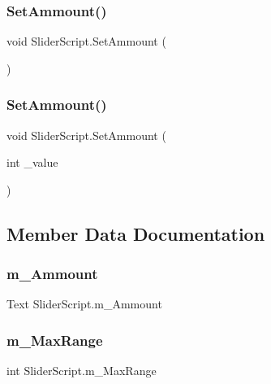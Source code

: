 \subsubsection{\texorpdfstring{SetAmmount()}{SetAmmount()}\hspace{0.1cm}{\footnotesize\ttfamily [1/2]}}
{\footnotesize\ttfamily void Slider\+Script.\+Set\+Ammount (\begin{DoxyParamCaption}{ }\end{DoxyParamCaption})}

\mbox{\label{class_slider_script_ae853030d4c38adbb92a4a914baf4e678}} 
\subsubsection{\texorpdfstring{SetAmmount()}{SetAmmount()}\hspace{0.1cm}{\footnotesize\ttfamily [2/2]}}
{\footnotesize\ttfamily void Slider\+Script.\+Set\+Ammount (\begin{DoxyParamCaption}\item[{int}]{\+\_\+value }\end{DoxyParamCaption})}



\subsection{Member Data Documentation}
\mbox{\label{class_slider_script_a92ee771d88249866ac21cb988b66b8b9}} 
\subsubsection{\texorpdfstring{m\_Ammount}{m\_Ammount}}
{\footnotesize\ttfamily Text Slider\+Script.\+m\+\_\+\+Ammount}

\mbox{\label{class_slider_script_ad8d4815c350c527a134607e9915b49d4}} 
\subsubsection{\texorpdfstring{m\_MaxRange}{m\_MaxRange}}
{\footnotesize\ttfamily int Slider\+Script.\+m\+\_\+\+Max\+Range}

